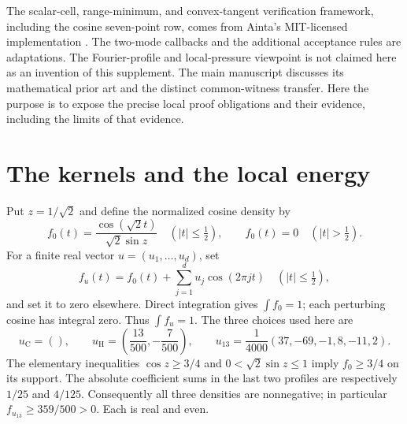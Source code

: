 \documentclass[11pt]{amsart}
\numberwithin{equation}{section}
\begin{document}
The scalar-cell, range-minimum, and convex-tangent verification framework,
including the cosine seven-point row, comes from Ainta's MIT-licensed
implementation \cite{ainta}. The two-mode callbacks and the additional
acceptance rules are adaptations. The Fourier-profile and local-pressure
viewpoint is not claimed here as an invention of this supplement. The
main manuscript discusses its mathematical prior art and the distinct
common-witness transfer. Here the purpose is to expose the precise local
proof obligations and their evidence, including the limits of that
evidence.

\section{The kernels and the local energy}

Put $z=1/\sqrt2$ and define the normalized cosine density by
\begin{equation}\label{eq:density0}
 f_0(t)=\frac{\cos(\sqrt2t)}{\sqrt2\sin z}
 \quad (|t|\leq\tfrac12),\qquad f_0(t)=0\quad(|t|>\tfrac12).
\end{equation}
For a finite real vector $u=(u_1,\ldots,u_d)$, set
\begin{equation}\label{eq:densityu}
 f_u(t)=f_0(t)+\sum_{j=1}^d u_j\cos(2\pi jt)
 \quad (|t|\leq\tfrac12),
\end{equation}
and set it to zero elsewhere. Direct integration gives $\int f_0=1$;
each perturbing cosine has integral zero. Thus $\int f_u=1$.
The three choices used here are
\begin{equation}\label{eq:profiles}
 u_{\mathrm C}=(),\qquad
 u_{\mathrm H}=\left(\frac{13}{500},-\frac7{500}\right),\qquad
 u_{13}=\frac1{4000}(37,-69,-1,8,-11,2).
\end{equation}
The elementary inequalities $\cos z\geq3/4$ and
$0<\sqrt2\sin z\leq1$ imply $f_0\geq3/4$ on its support.
The absolute coefficient sums in the last two profiles are respectively
$1/25$ and $4/125$. Consequently all three densities are nonnegative;
in particular $f_{u_{13}}\geq359/500>0$. Each is real and even.
\end{document}
